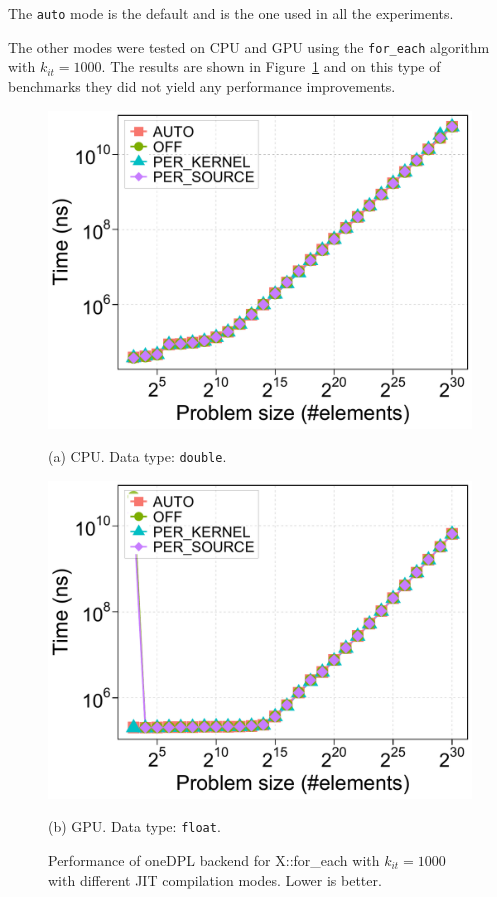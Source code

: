 \documentclass[sigconf]{acmart}
\begin{document}
The \texttt{auto} mode is the default and is the one used in all the
experiments.

The other modes were tested on CPU and GPU using the \texttt{for\_each}
algorithm with $k_{it} = 1000$. The results are shown in
Figure~\ref{fig:oneDPL_jit_modes} and on this type of benchmarks they did not
yield any performance improvements.

\begin{figure}[H]
      \centering
      \begin{minipage}[t]{0.48\linewidth}
            \centering
            \includegraphics[width=\linewidth]{figures/problemSize_time_onedpl-cpu_jit-for_each-k1000}
            \caption*{(a) CPU. Data type: \texttt{double}.}
      \end{minipage}
      \hfill
      \begin{minipage}[t]{0.48\linewidth}
            \centering
            \includegraphics[width=\linewidth]{figures/problemSize_time_onedpl-gpu_jit-for_each-k1000}
            \caption*{(b) GPU. Data type: \texttt{float}.}
      \end{minipage}
      \caption{Performance of oneDPL backend for X::for\_each with $k_{it} = 1000$ with different JIT compilation modes. Lower is better.}\label{fig:oneDPL_jit_modes}
\end{figure}
\end{document}
